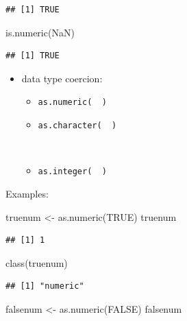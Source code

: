 \documentclass[
]{book}
\newenvironment{Shaded}{\begin{snugshade}}{\end{snugshade}}
\newcommand{\ConstantTok}[1]{\textcolor[rgb]{0.00,0.00,0.00}{#1}}
\newcommand{\FunctionTok}[1]{\textcolor[rgb]{0.00,0.00,0.00}{#1}}
\newcommand{\NormalTok}[1]{#1}
\newcommand{\OtherTok}[1]{\textcolor[rgb]{0.56,0.35,0.01}{#1}}
\providecommand{\tightlist}{%
  \setlength{\itemsep}{0pt}\setlength{\parskip}{0pt}}
\begin{document}
\begin{verbatim}
## [1] TRUE
\end{verbatim}

\begin{Shaded}
\begin{Highlighting}[]
\FunctionTok{is.numeric}\NormalTok{(}\ConstantTok{NaN}\NormalTok{)}
\end{Highlighting}
\end{Shaded}

\begin{verbatim}
## [1] TRUE
\end{verbatim}

\begin{itemize}
\item
  data type coercion:

  \begin{itemize}
  \tightlist
  \item
    \texttt{as.numeric(\ \ )}
  \item
    \texttt{as.character(\ \ )}\strut \\
  \item
    \texttt{as.integer(\ \ )}
  \end{itemize}
\end{itemize}

Examples:

\begin{Shaded}
\begin{Highlighting}[]
\NormalTok{truenum }\OtherTok{\textless{}{-}} \FunctionTok{as.numeric}\NormalTok{(}\ConstantTok{TRUE}\NormalTok{)}
\NormalTok{truenum}
\end{Highlighting}
\end{Shaded}

\begin{verbatim}
## [1] 1
\end{verbatim}

\begin{Shaded}
\begin{Highlighting}[]
\FunctionTok{class}\NormalTok{(truenum)}
\end{Highlighting}
\end{Shaded}

\begin{verbatim}
## [1] "numeric"
\end{verbatim}

\begin{Shaded}
\begin{Highlighting}[]
\NormalTok{falsenum }\OtherTok{\textless{}{-}} \FunctionTok{as.numeric}\NormalTok{(}\ConstantTok{FALSE}\NormalTok{)}
\NormalTok{falsenum}
\end{Highlighting}
\end{Shaded}
\end{document}
